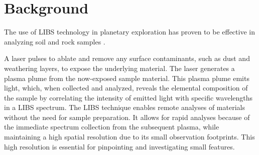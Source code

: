 \section{Background}\label{sec:background}
The use of LIBS technology in planetary exploration has proven to be effective in analyzing soil and rock samples \citep{knight2000}.

A laser pulses to ablate and remove any surface contaminants, such as dust and weathering layers, to expose the underlying material.
The laser generates a plasma plume from the now-exposed sample material.
This plasma plume emits light, which, when collected and analyzed, reveals the elemental composition of the sample by correlating the intensity of emitted light with specific wavelengths in a LIBS spectrum.
The LIBS technique enables remote analyses of materials without the need for sample preparation.
It allows for rapid analyses because of the immediate spectrum collection from the subsequent plasma, while maintaining a high spatial resolution due to its small observation footprints.
This high resolution is essential for pinpointing and investigating small features. \cite{wiensChemcam2012}




